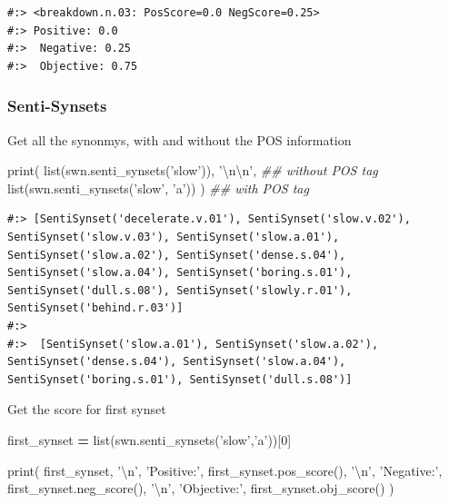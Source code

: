 \documentclass[
]{book}
\newenvironment{Shaded}{\begin{snugshade}}{\end{snugshade}}
\newcommand{\BuiltInTok}[1]{#1}
\newcommand{\CharTok}[1]{\textcolor[rgb]{0.5,0.5,0.5}{#1}}
\newcommand{\CommentTok}[1]{\textcolor[rgb]{0.37,0.37,0.37}{\textit{#1}}}
\newcommand{\DecValTok}[1]{\textcolor[rgb]{0.06,0.06,0.06}{#1}}
\newcommand{\NormalTok}[1]{#1}
\newcommand{\OperatorTok}[1]{\textcolor[rgb]{0.43,0.43,0.43}{\textbf{#1}}}
\newcommand{\StringTok}[1]{\textcolor[rgb]{0.5,0.5,0.5}{#1}}
\begin{document}
\begin{verbatim}
#:> <breakdown.n.03: PosScore=0.0 NegScore=0.25> 
#:> Positive: 0.0 
#:>  Negative: 0.25 
#:>  Objective: 0.75
\end{verbatim}

\hypertarget{senti-synsets}{%
\subsubsection{Senti-Synsets}\label{senti-synsets}}

Get all the synonmys, with and without the POS information

\begin{Shaded}
\begin{Highlighting}[]
\BuiltInTok{print}\NormalTok{( }\BuiltInTok{list}\NormalTok{(swn.senti_synsets(}\StringTok{'slow'}\NormalTok{)), }\StringTok{'}\CharTok{\textbackslash{}n\textbackslash{}n}\StringTok{'}\NormalTok{,  }\CommentTok{## without POS tag}
       \BuiltInTok{list}\NormalTok{(swn.senti_synsets(}\StringTok{'slow'}\NormalTok{, }\StringTok{'a'}\NormalTok{)) )   }\CommentTok{## with POS tag}
\end{Highlighting}
\end{Shaded}

\begin{verbatim}
#:> [SentiSynset('decelerate.v.01'), SentiSynset('slow.v.02'), SentiSynset('slow.v.03'), SentiSynset('slow.a.01'), SentiSynset('slow.a.02'), SentiSynset('dense.s.04'), SentiSynset('slow.a.04'), SentiSynset('boring.s.01'), SentiSynset('dull.s.08'), SentiSynset('slowly.r.01'), SentiSynset('behind.r.03')] 
#:> 
#:>  [SentiSynset('slow.a.01'), SentiSynset('slow.a.02'), SentiSynset('dense.s.04'), SentiSynset('slow.a.04'), SentiSynset('boring.s.01'), SentiSynset('dull.s.08')]
\end{verbatim}

Get the score for first synset

\begin{Shaded}
\begin{Highlighting}[]
\NormalTok{first_synset }\OperatorTok{=} \BuiltInTok{list}\NormalTok{(swn.senti_synsets(}\StringTok{'slow'}\NormalTok{,}\StringTok{'a'}\NormalTok{))[}\DecValTok{0}\NormalTok{]}

\BuiltInTok{print}\NormalTok{(}
\NormalTok{  first_synset, }\StringTok{'}\CharTok{\textbackslash{}n}\StringTok{'}\NormalTok{,}
  \StringTok{'Positive:'}\NormalTok{,  first_synset.pos_score(), }\StringTok{'}\CharTok{\textbackslash{}n}\StringTok{'}\NormalTok{,}
  \StringTok{'Negative:'}\NormalTok{,  first_synset.neg_score(), }\StringTok{'}\CharTok{\textbackslash{}n}\StringTok{'}\NormalTok{,}
  \StringTok{'Objective:'}\NormalTok{, first_synset.obj_score()}
\NormalTok{)}
\end{Highlighting}
\end{Shaded}
\end{document}
